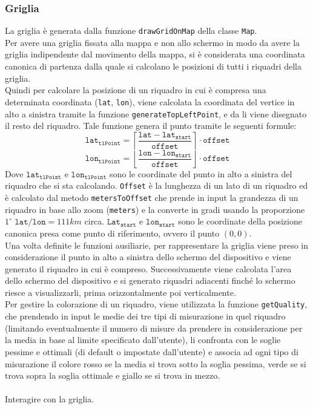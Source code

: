 \documentclass[11pt]{article}
\begin{document}
\subsubsection{Griglia}
La griglia è generata dalla funzione \texttt{drawGridOnMap} della classe \texttt{Map}.\\
Per avere una griglia fissata alla mappa e non allo schermo in modo da avere la griglia indipendente dal movimento della mappa, si è considerata una coordinata canonica di partenza dalla quale si calcolano le posizioni di tutti i riquadri della griglia. \\
Quindi per calcolare la posizione di un riquadro in cui è compresa una determinata coordinata (\texttt{lat}, \texttt{lon}), viene calcolata la coordinata del vertice in alto a sinistra tramite la funzione \texttt{generateTopLeftPoint}, e da li viene disegnato il resto del riquadro. Tale funzione genera il punto tramite le seguenti formule:
\begin{equation*}
    \texttt{lat}_{\texttt{tlPoint}} = \left \lceil \dfrac{\texttt{lat} - \texttt{lat}_{\texttt{start}}}{\texttt{offset}} \right \rceil \cdot \texttt{offset}
\end{equation*}
\begin{equation*}
    \texttt{lon}_{\texttt{tlPoint}} = \left \lfloor \dfrac{\texttt{lon} - \texttt{lon}_{\texttt{start}}}{\texttt{offset}} \right \rfloor \cdot \texttt{offset}
\end{equation*}
Dove $\texttt{lat}_{\texttt{tlPoint}}$ e $\texttt{lon}_{\texttt{tlPoint}}$ sono le coordinate del punto in alto a sinistra del riquadro che si sta calcolando. \texttt{Offset} è la lunghezza di un lato di un riquadro ed è calcolato dal metodo \texttt{metersToOffset} che prende in input la grandezza di un riquadro in base allo zoom (\texttt{meters}) e la converte in gradi usando la proporzione $1^{\circ} \texttt{ lat}/\texttt{lon} = 111km$ circa. $\texttt{Lat}_{\texttt{start}}$ e $\texttt{lon}_{\texttt{start}}$ sono le coordinate della posizione canonica presa come punto di riferimento, ovvero il punto $(0,0)$. \\
Una volta definite le funzioni ausiliarie, per rappresentare la griglia viene preso in considerazione il punto in alto a sinistra dello schermo del dispositivo e viene generato il riquadro in cui è compreso. Successivamente viene calcolata l'area dello schermo del dispositivo e si generato riquadri adiacenti finché lo schermo riesce a visualizzarli, prima orizzontalmente poi verticalmente. \\
Per gestire la colorazione di un riquadro, viene utilizzata la funzione \texttt{getQuality}, che prendendo in input le medie dei tre tipi di misurazione in quel riquadro (limitando eventualmente il numero di misure da prendere in considerazione per la media in base al limite specificato dall'utente), li confronta con le soglie pessime e ottimali (di default o impostate dall'utente) e associa ad ogni tipo di misurazione il colore rosso se la media si trova sotto la soglia pessima, verde se si trova sopra la soglia ottimale e giallo se si trova in mezzo. \\ \\
Interagire con la griglia.
\end{document}
